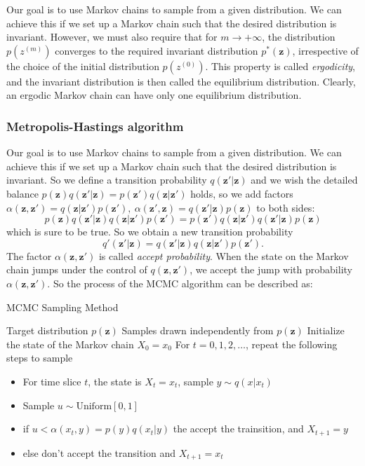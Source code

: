 \documentclass[a4paper]{book}
\newcommand{\mbf}{\mathbf}
\newcommand{\zz}{\mbf z}
\newcommand{\tit}{\textit}
\begin{document}
Our goal is to use Markov chains to sample from a given distribution. We can achieve this if we set up a Markov chain such that the desired distribution is invariant. However, we must also require that for $m\rightarrow +\infty$, the distribution $p(z^{(m)})$ converges to the required invariant distribution $p^*(\zz)$, irrespective of the choice of the initial distribution $p(z^{(0)})$. This property is called \tit{ergodicity}, and the invariant distribution is then called the equilibrium distribution. Clearly, an ergodic Markov chain can have only one equilibrium distribution.
\subsubsection*{Metropolis-Hastings algorithm}
Our goal is to use Markov chains to sample from a given distribution. We can achieve this if we set up a Markov chain such that the desired distribution is invariant. So we define a transition probability $q(\zz'|\zz)$ and we wish the detailed balance $p(\zz)q(\zz'|\zz)=p(\zz')q(\zz|\zz')$ holds, so we add factors $\alpha(\zz,\zz')=q(\zz|\zz')p(\zz'),\ \alpha(\zz',\zz)=q(\zz'|\zz)p(\zz)$ to both sides:
\begin{equation}\label{eq3.4.2}
  p(\zz)q(\zz'|\zz)q(\zz|\zz')p(\zz')=p(\zz')q(\zz|\zz')q(\zz'|\zz)p(\zz)
\end{equation}
which is sure to be true. So we obtain a new transition probability
\begin{equation}\label{}
  q'(\zz'|\zz)=q(\zz'|\zz)q(\zz|\zz')p(\zz').
\end{equation}
The factor $\alpha(\zz,\zz')$ is called \textit{accept probability}. When the state on the  Markov chain jumps under the control of $q(\zz,\zz')$, we accept the jump with probability $\alpha(\zz,\zz')$. So the process of the MCMC algorithm can be described as:
\begin{algorithm}[H]
\caption{MCMC Sampling Method}
\begin{algorithmic}[1]
\Require Target distribution $p(\zz)$
\Ensure Samples drawn independently from $p(\zz)$
\State Initialize the state of the Markov chain $X_0 = x_0$
\State For $t = 0,1,2,\dots$, repeat the following steps to sample
    \begin{itemize}
      \item For time slice $t$, the state is $X_t = x_t$, sample $y\sim q(x|x_t)$
      \item Sample $u\sim \mathrm{Uniform}[0,1]$
      \item if $u<\alpha(x_t, y)=p(y)q(x_t|y)$ the accept the trainsition, and $X_{t+1}=y$
      \item else don't accept the transition and $X_{t+1} = x_t$
    \end{itemize}
\end{algorithmic}
\end{algorithm}
\end{document}
